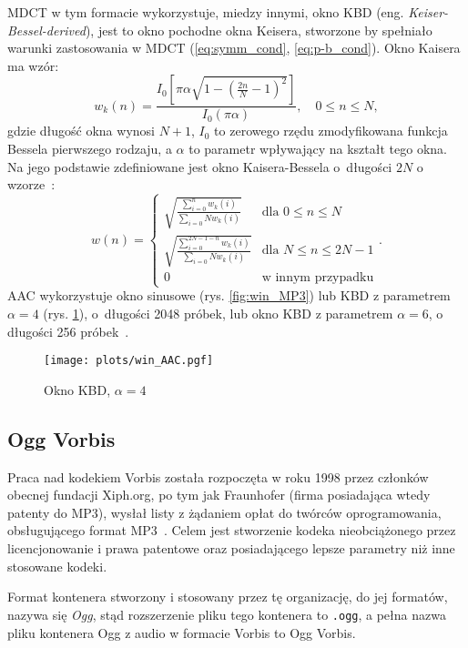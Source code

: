 \documentclass[pl,12pt]{aghdpl}
\let\Oldsubsection\subsection%
\renewcommand{\subsection}{\FloatBarrier\Oldsubsection}
\begin{document}
MDCT w tym formacie wykorzystuje, miedzy innymi, okno KBD (eng.
\textit{Keiser-Bessel-derived}), jest to okno pochodne okna Keisera, stworzone
by spełniało warunki zastosowania w MDCT (\ref{eq:symm_cond},
\ref{eq:p-b_cond}). Okno Kaisera ma wzór:
\begin{equation}\label{eq:kaiser_win}
  w_k(n) = \frac{I_0\left[\pi\alpha\sqrt{1-\left(\frac{2n}{N}-1\right)^2}\right]}
  {I_0(\pi\alpha)},\quad 0 \leq n \leq N,
\end{equation}
gdzie długość okna wynosi $N+1$, $I_0$ to zerowego rzędu zmodyfikowana funkcja
Bessela pierwszego rodzaju, a $\alpha$ to parametr wpływający na kształt tego
okna. Na jego podstawie zdefiniowane jest okno Kaisera-Bessela o~długości $2N$
o wzorze~\cite{BosiGoldberg2002}:
\begin{equation}\label{eq:kbd_win}
  w(n) = \begin{cases}
    \sqrt{\frac{\sum_{i=0}^{n}w_k(i)}{\sum_{i=0}{N}w_k(i)}} & \text{dla }0 \leq n \leq N \\
    \sqrt{\frac{\sum_{i=0}^{2N-1-n}w_k(i)}{\sum_{i=0}{N}w_k(i)}} & \text{dla }N \leq n \leq 2N-1 \\
    0 & \text{w innym przypadku}
  \end{cases}.
\end{equation}
AAC wykorzystuje okno sinusowe (rys. \ref{fig:win_MP3}) lub KBD z parametrem
$\alpha = 4$ (rys.  \ref{fig:win_AAC}), o~długości 2048 próbek, lub okno KBD z
parametrem $\alpha = 6$, o długości 256 próbek~\cite{KimRafii2018}.

\begin{figure}[!tbh]
  \centering
  \texttt{[image: plots/win\_AAC.pgf]}
  \caption{Okno KBD, $\alpha = 4$}
  \label{fig:win_AAC}
\end{figure}

\subsection{Ogg Vorbis}

Praca nad kodekiem Vorbis została rozpoczęta w roku 1998 przez członków obecnej
fundacji Xiph.org, po tym jak Fraunhofer (firma posiadająca wtedy patenty do
MP3), wysłał listy z żądaniem opłat do twórców oprogramowania, obsługującego
format MP3~\cite{XiphNaming}. Celem jest stworzenie kodeka nieobciążonego przez
licencjonowanie i prawa patentowe oraz posiadającego lepsze parametry niż inne
stosowane kodeki.

Format kontenera stworzony i stosowany przez tę organizację, do jej formatów,
nazywa się \textit{Ogg}, stąd rozszerzenie pliku tego kontenera to
\lstinline|.ogg|, a pełna nazwa pliku kontenera Ogg z audio w formacie Vorbis
to Ogg Vorbis.
\end{document}
